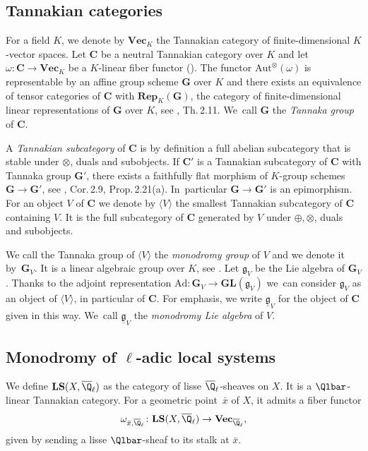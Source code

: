\subsection{Tannakian categories}
For a field $K$, we denote by $\mathbf{Vec}_K$ the Tannakian category of finite-dimensional $K$-vector spaces. Let $\mathbf{C}$ be a neutral Tannakian category over $K$ and let $\omega\colon\mathbf{C}\to\mathbf{Vec}_K$ be a $K$-linear fiber functor (\cite[Def.\,2.19]{Deligne-Milne-Tannakian-Categories}). The functor $\mathrm{Aut}^\otimes(\omega)$ is representable by an affine group scheme $\mathbf{G}$ over $K$ and there exists an equivalence of tensor categories of $\mathbf{C}$ with $\mathbf{Rep}_K(\mathbf{G})$, the category of finite-dimensional linear representations of $\mathbf{G}$ over $K$, see \loccit, Th.\,2.11. We~call $\mathbf{G}$ the \emph{Tannaka group} of $\mathbf{C}$.

A \emph{Tannakian subcategory} of $\mathbf{C}$ is by definition a full abelian subcategory that is stable under $\otimes$, duals and subobjects. If $\mathbf{C}'$ is a Tannakian subcategory of $\mathbf{C}$ with Tannaka group $\mathbf{G}'$, there exists a faithfully flat morphism of $K$-group schemes $\mathbf{G}\to\mathbf{G}'$, see \loccit, Cor.\,2.9, Prop.\,2.21(a). In~particular $\mathbf{G}\to\mathbf{G}'$ is an epimorphism. For an object $V$ of $\mathbf{C}$ we denote by $\langle V\rangle$ the smallest Tannakian subcategory of $\mathbf{C}$ containing $V$. It is the full subcategory of $\mathbf{C}$ generated by $V$ under $\oplus, \otimes$, duals and subobjects.

We call the Tannaka group of $\langle V\rangle$ the \emph{monodromy group} of $V$ and we denote it by~$\mathbf{G}_V$. It is a linear algebraic group over $K$, see \cite[Prop.\,2.20(b)]{Deligne-Milne-Tannakian-Categories}. Let $\mathfrak{g}_V$ be the Lie algebra of $\mathbf{G}_V$. Thanks to the adjoint representation $\mathrm{Ad}\colon\mathbf{G}_V\to\mathbf{GL}(\mathfrak{g}_V)$ we~can consider $\mathfrak{g}_V$ as an object of $\langle V\rangle$, in particular of $\mathbf{C}$. For emphasis, we write $\underline{\mathfrak{g}}_V$ for the object of $\mathbf{C}$ given in this way. We~call $\underline{\mathfrak{g}}_V$ the \emph{monodromy Lie algebra} of $V$.

\subsection{Monodromy of \texorpdfstring{$\ell$}{l}-adic local systems}
We define $\mathbf{LS}(X,\overline{\Q}_\ell)$ as the category of lisse $\overline{\Q}_\ell$-sheaves on $X$. It is a $\Qlbar$-linear Tannakian category. For a geometric point~$\bar x$ of $X$, it admits a fiber functor
\[
\omega_{\bar x,\overline{\Q}_\ell}\colon\mathbf{LS}(X,\overline{\Q}_\ell)\to\mathbf{Vec}_{\overline{\Q}_\ell},
\]
given by sending a lisse $\Qlbar$-sheaf to its stalk at $\bar x$.


